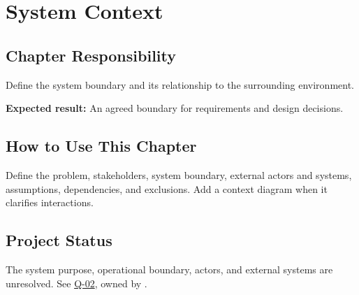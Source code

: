 \chapter{System Context}
\section{Chapter Responsibility}
\label{Section:SystemContextResponsibility}
Define the system boundary and its relationship to the surrounding environment.

\noindent\textbf{Expected result:} An agreed boundary for requirements and design decisions.

\section{How to Use This Chapter}
Define the problem, stakeholders, system boundary, external actors and systems, assumptions, dependencies, and exclusions. Add a context diagram when it clarifies interactions.

\section{Project Status}
The system purpose, operational boundary, actors, and external systems are unresolved.
See \hyperref[Question:Q-02]{Q-02}, owned by \DocumentOwner.
